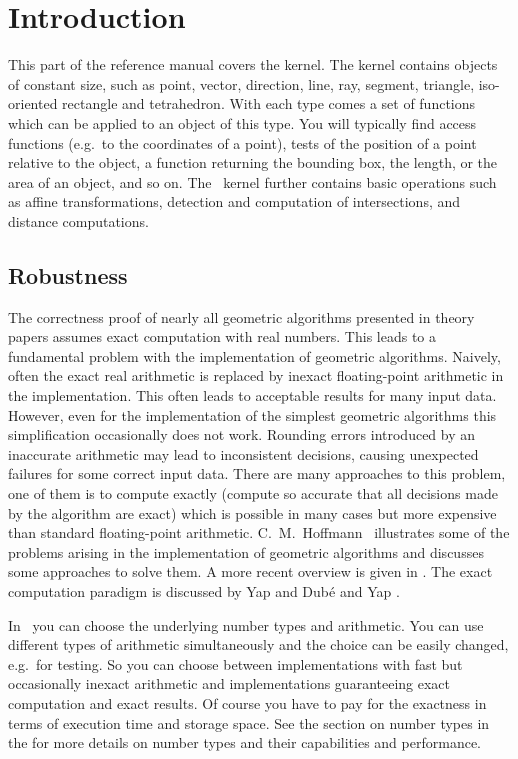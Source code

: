 \chapter{Introduction}


{This} part of the reference manual covers the kernel.
The kernel contains objects of constant size, such as point, vector, 
direction, line, ray, segment, triangle, iso-oriented rectangle and 
tetrahedron. 
With each type comes a set of functions which can be applied to an object 
of this type.  
You will typically find access functions (e.g.\ to the coordinates of a point), 
tests of the position of a point relative to the object, a function returning 
the bounding box, the length, or the area of an object, and so on.
The \cgal\ kernel further contains basic operations such as affine
transformations, detection and computation of intersections, and distance 
computations.

\section{Robustness}
The correctness proof of nearly all geometric algorithms presented
in theory papers assumes exact computation with real numbers.
This leads to a fundamental problem with the implementation of geometric
algorithms.
Naively, often the exact real arithmetic is replaced by inexact floating-point 
arithmetic in the implementation.
This often leads to acceptable results for many input data.
However, even for the implementation of the simplest geometric 
algorithms this simplification occasionally does not work.
Rounding errors introduced by an inaccurate arithmetic may lead to 
inconsistent decisions, causing unexpected failures for some correct 
input data.
There are many approaches to this problem, one of them is to compute
exactly (compute so accurate that all decisions made by the algorithm
are exact) which is possible in many cases but more expensive
than standard floating-point arithmetic.
C.~M.~Hoffmann~\cite{h-gsm-89,h-pargc-89} illustrates some 
of the problems arising in the implementation of geometric algorithms
and discusses some approaches to solve them. 
A more recent overview is given in \cite{s-rpgc-99}.
The exact computation paradigm is discussed by Yap and Dub\'e 
\cite{yd-ecp-95} and Yap \cite{y-tegc-97}.

In \cgal\ you can choose the underlying number types and arithmetic.  
You can use different types of arithmetic simultaneously and the choice can 
be easily changed, e.g.\ for testing.  
So you can choose between implementations with fast but occasionally inexact 
arithmetic and implementations guaranteeing exact computation and exact 
results.  
Of course you have to pay for the exactness in terms of execution time 
and storage space.  
See the section on number types in the 
for more details on number types and their capabilities and performance.

